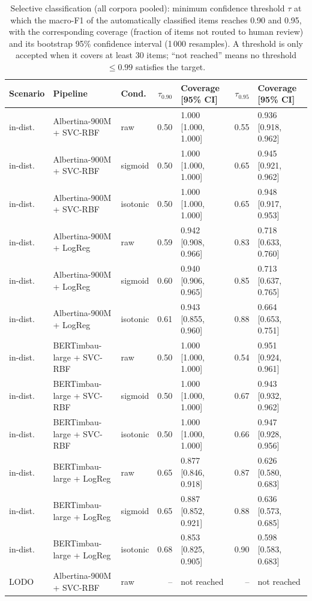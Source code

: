 \begin{table}[t]
\centering
\small
\caption{Selective classification (all corpora pooled): minimum confidence threshold $\tau$ at which the macro-F1 of the automatically classified items reaches 0.90 and 0.95, with the corresponding coverage (fraction of items not routed to human review) and its bootstrap 95\% confidence interval (1\,000 resamples). A threshold is only accepted when it covers at least 30 items; ``not reached'' means no threshold $\le 0.99$ satisfies the target.}
\label{tab:triage-summary}
\begin{tabular}{lllrlrl}
\toprule
Scenario & Pipeline & Cond. & $\tau_{0.90}$ & Coverage [95\% CI] & $\tau_{0.95}$ & Coverage [95\% CI] \\
\midrule
in-dist. & Albertina-900M + SVC-RBF & raw & 0.50 & 1.000 [1.000, 1.000] & 0.55 & 0.936 [0.918, 0.962] \\
in-dist. & Albertina-900M + SVC-RBF & sigmoid & 0.50 & 1.000 [1.000, 1.000] & 0.65 & 0.945 [0.921, 0.962] \\
in-dist. & Albertina-900M + SVC-RBF & isotonic & 0.50 & 1.000 [1.000, 1.000] & 0.65 & 0.948 [0.917, 0.953] \\
in-dist. & Albertina-900M + LogReg & raw & 0.59 & 0.942 [0.908, 0.966] & 0.83 & 0.718 [0.633, 0.760] \\
in-dist. & Albertina-900M + LogReg & sigmoid & 0.60 & 0.940 [0.906, 0.965] & 0.85 & 0.713 [0.637, 0.765] \\
in-dist. & Albertina-900M + LogReg & isotonic & 0.61 & 0.943 [0.855, 0.960] & 0.88 & 0.664 [0.653, 0.751] \\
in-dist. & BERTimbau-large + SVC-RBF & raw & 0.50 & 1.000 [1.000, 1.000] & 0.54 & 0.951 [0.924, 0.961] \\
in-dist. & BERTimbau-large + SVC-RBF & sigmoid & 0.50 & 1.000 [1.000, 1.000] & 0.67 & 0.943 [0.932, 0.962] \\
in-dist. & BERTimbau-large + SVC-RBF & isotonic & 0.50 & 1.000 [1.000, 1.000] & 0.66 & 0.947 [0.928, 0.956] \\
in-dist. & BERTimbau-large + LogReg & raw & 0.65 & 0.877 [0.846, 0.918] & 0.87 & 0.626 [0.580, 0.683] \\
in-dist. & BERTimbau-large + LogReg & sigmoid & 0.65 & 0.887 [0.852, 0.921] & 0.88 & 0.636 [0.573, 0.685] \\
in-dist. & BERTimbau-large + LogReg & isotonic & 0.68 & 0.853 [0.825, 0.905] & 0.90 & 0.598 [0.583, 0.683] \\
LODO & Albertina-900M + SVC-RBF & raw & -- & not reached & -- & not reached \\

\end{tabular}
\end{table}

